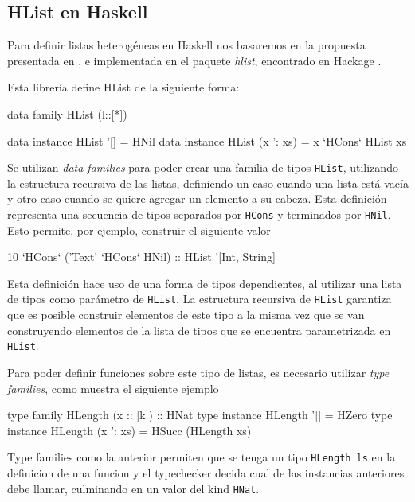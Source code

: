 \subsection{HList en Haskell}

Para definir listas heterogéneas en Haskell nos basaremos en la propuesta presentada en \cite{Kiselyov:2004:STH:1017472.1017488}, e implementada en el paquete \textit{hlist}, encontrado en Hackage \cite{HListHackage}. 

Esta librería define HList de la siguiente forma:

\begin{code}
data family HList (l::[*])

data instance HList '[] = HNil
data instance HList (x ': xs) = x `HCons` HList xs
\end{code}

Se utilizan \textit{data families} para poder crear una familia de tipos \texttt{HList}, utilizando la estructura recursiva de las listas, definiendo un caso cuando una lista está vacía y otro caso cuando se quiere agregar un elemento a su cabeza.
Esta definición representa una secuencia de tipos separados por \texttt{HCons} y terminados por \texttt{HNil}. 
Esto permite, por ejemplo, construir el siguiente valor

\begin{code}
10 `HCons` ('Text' `HCons` HNil) :: HList '[Int, String]
\end{code}

Esta definición hace uso de una forma de tipos dependientes, al utilizar una lista de tipos como parámetro de \texttt{HList}. La estructura recursiva de \texttt{HList} garantiza que es posible construir elementos de este tipo a la misma vez que se van construyendo elementos de la lista de tipos que se encuentra parametrizada en \texttt{HList}.

Para poder definir funciones sobre este tipo de listas, es necesario utilizar \textit{type families}, como muestra el siguiente ejemplo

\begin{code}
type family HLength (x :: [k]) :: HNat
type instance HLength '[] = HZero
type instance HLength (x ': xs) = HSucc (HLength xs)
\end{code}

Type families como la anterior permiten que se tenga un tipo \texttt{HLength ls} en la definicion de una funcion y el typechecker decida cual de las instancias anteriores debe llamar, culminando en un valor del kind \texttt{HNat}.

